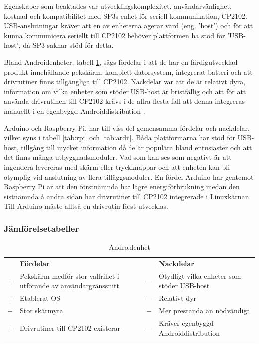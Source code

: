 \documentclass{article}
\begin{document}
            \noindent Egenskaper som beaktades var utvecklingskomplexitet, användarvänlighet, kostnad och kompatibilitet med SP3s enhet för seriell kommunikation, CP2102. USB-anslutningar kräver att en av enheterna agerar värd (eng. 'host') och för att kunna kommunicera seriellt till CP2102 behöver plattformen ha stöd för 'USB-host', då SP3 saknar stöd för detta. \bigskip
            
            \noindent Bland Androidenheter, tabell \ref{tab:android}, sågs fördelar i att de har en färdigutvecklad produkt innehållande pekskärm, komplett datorsystem, integrerat batteri och att drivrutiner finns tillgängliga till CP2102. Nackdelar var att de är relativt dyra, information om vilka enheter som stöder USB-host är bristfällig och att för att använda drivrutinen till CP2102 krävs i de allra flesta fall att denna integreras manuellt i en egenbyggd Androiddistribution \cite{SL_AN809}. \bigskip
            
            \noindent Arduino och Raspberry Pi, har till viss del gemensamma fördelar och nackdelar, vilket syns i tabell \ref{tab:rpi} och \ref{tab:ardu}. Båda plattformarna har stöd för USB-host, tillgång till mycket information då de är populära bland entusiaster och att det finns många utbyggnadsmoduler. Vad som kan ses som negativt är att ingendera levereras med skärm eller tryckknappar och att enheten kan bli otymplig vid anslutning av flera tilläggsmoduler. En fördel Arduino har gentemot Raspberry Pi är att den förstnämnda har lägre energiförbrukning medan den sistnämnda å andra sidan har drivrutiner till CP2102 integrerade i Linuxkärnan. Till Arduino måste alltså en drivrutin först utvecklas.
            \enlargethispage{\baselineskip}

            \subsubsection{Jämförelsetabeller}
            \label{subsub:comptab}
            \begin{table}[ht]
                \caption{Androidenhet}\label{tab:android}
                \begin{tabularx}{\textwidth}{@{}cXcX}
                    & \textbf{Fördelar}     & & \textbf{Nackdelar} \\
                    $+$ & Pekskärm medför stor valfrihet i utförande av användargränssnitt     &                            $-$ & Otydligt vilka enheter som
                                                      stöder USB-host \\
                    $+$ &  Etablerat OS     &   $-$ & Relativt dyr \\
                    $+$ &  Stor skärmyta    &   $-$ & Mer prestanda än nödvändigt \\
                    $+$ &  Drivrutiner till CP2102 existerar &
                                                $-$ & Kräver egenbyggd Androiddistribution \\
                \end{tabularx}\\
            \end{table}
                
\end{document}
